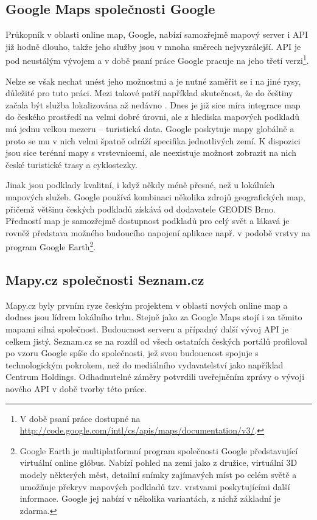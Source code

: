 \subsection{Google Maps společnosti Google}
Průkopník v oblasti online map, Google, nabízí samozřejmě mapový
server i API již hodně dlouho, takže jeho služby jsou v mnoha směrech
nej\-vyzrálejší. API je pod neustálým vývojem a v době psaní práce
Google pracuje na jeho třetí
verzi\footnote{V době psaní práce dostupné na
\url{http://code.google.com/intl/cs/apis/maps/documentation/v3/}.}.

Nelze se však nechat unést jeho možnostmi a je nutné zaměřit se i na
jiné rysy, důležité pro tuto práci. Mezi takové patří
například skutečnost, že do češtiny začala být služba lokalizována až
nedávno \cite{googleCesky}.
Dnes je již sice míra integrace map do českého prostředí na velmi
dobré úrovni, ale z hlediska mapových podkladů má jednu velkou mezeru
-- turistická data. Google poskytuje mapy globálně a proto se mu v
nich velmi špatně odráží specifika jednotlivých zemí. K dispozici
jsou sice terénní mapy s vrstevnicemi, ale neexistuje možnost
zobrazit na nich české turistické trasy a cyklostezky.

Jinak jsou podklady kvalitní, i když někdy méně přesné, než u
lokálních mapových služeb. Google používá kombinaci několika zdrojů
geografických map, přičemž většinu českých podkladů získává od
dodavatele GEODIS Brno. Předností map je samozřejmě dostupnost
podkladů pro celý svět a lákavá je rovněž představa možného budoucího 
napojení aplikace např. v podobě vrstvy na program Google
Earth\footnote{Google Earth je multiplatformní program společnosti
Google představující virtuální online glóbus. Nabízí pohled na zemi
jako z družice, virtuální 3D modely některých měst, detailní snímky
zajímavých míst po celém světě a umožňuje překryv mapových podkladů
tzv. vrstvami poskytujícími další informace. Google jej nabízí v
několika variantách, z nichž základní je zdarma.}.

\subsection{Mapy.cz společnosti Seznam.cz}
Mapy.cz byly prvním ryze českým projektem v oblasti nových online map
a dodnes jsou lídrem lokálního trhu. Stejně jako za Google Maps stojí
i za těmito mapami silná společnost. Budoucnost serveru a případný
další vývoj API je celkem jistý. Seznam.cz se na rozdíl od všech
ostatních českých portálů profiloval po vzoru Google spíše do
společnosti, jež svou budoucnost spojuje s technologickým pokrokem,
než do mediálního vydavatelství jako například Centrum Holdings.
Odhadnutelné záměry potvrdili uveřejněním zprávy o vývoji nového
API \cite{apiSeznam} v době tvorby této práce.

